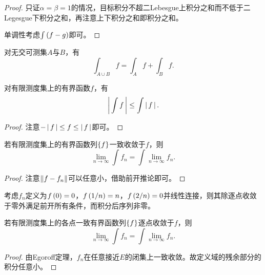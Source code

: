 \documentclass{ctexrep}
\begin{document}
  \begin{proof}
    只证$\alpha=\beta=1$的情况，目标积分不超二Lebesgue上积分之和而不低于二Legesgue下积分之和，再注意上下积分之和即积分之和。
    \par
    单调性考虑$\int\left(f-g\right)$即可。
  \end{proof}
  \begin{collary}
    对无交可测集$A$与$B$，有
    \[ \int_{A\cup B}f=\int_A f+\int_B f. \]
  \end{collary}
  \begin{collary}
    对有限测度集上的有界函数$f$，有
    \[ \left|\, \int f \,\right| \le \int \left|\, f \,\right|. \]
  \end{collary}
  \begin{proof}
    注意$-\left|\, f \,\right|\le f\le \left|\, f \,\right|$即可。
  \end{proof}
  \begin{proposition}
    若有限测度集上的有界函数列$\left\{f\right\}$一致收敛于$f$，则
    \[ \lim_{n\to\infty}\int f_n = \int \lim_{n\to\infty} f_n. \]
  \end{proposition}
  \begin{proof}
    注意$\left\| f-f_n \right\|$可以任意小，借助前开推论即可。
  \end{proof}
  \begin{ex}
    考虑$f_n$定义为$f\left(0\right)=0$，$f\left(1/n\right)=n$，$f\left(2/n\right)=0$并线性连接，则其除逐点收敛于零外满足前开所有条件，而积分后序列非零。
  \end{ex}
  \begin{theorem}[有界收敛定理]
    若有限测度集上的各点一致有界函数列$\left\{f\right\}$逐点收敛于$f$，则
    \[ \lim_{n\to\infty}\int f_n = \int \lim_{n\to\infty} f_n. \]
  \end{theorem}
  \begin{proof}
    由Egoroff定理，$f_n$在任意接近$E$的闭集上一致收敛。故定义域的残余部分的积分任意小。
  \end{proof}
\end{document}
